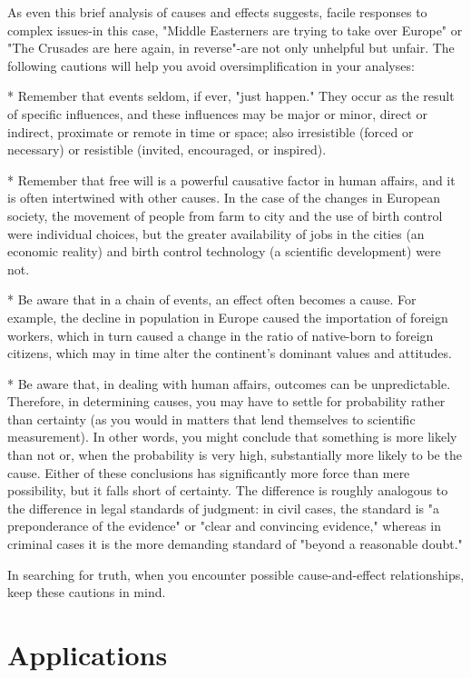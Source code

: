 \documentclass{book}
\begin{document}
As even this brief analysis of causes and effects suggests, facile responses to complex issues-in this case, "Middle Easterners are trying to take over Europe" or "The Crusades are here again, in reverse"-are not only unhelpful but unfair. The following cautions will help you avoid oversimplification in your analyses:

* Remember that events seldom, if ever, "just happen." They occur as the result of specific influences, and these influences may be major or minor, direct or indirect, proximate or remote in time or space; also irresistible (forced or necessary) or resistible (invited, encouraged, or inspired).

* Remember that free will is a powerful causative factor in human affairs, and it is often intertwined with other causes. In the case of the changes in European society, the movement of people from farm to city and the use of birth control were individual choices, but the greater availability of jobs in the cities (an economic reality) and birth control technology (a scientific development) were not. 

* Be aware that in a chain of events, an effect often becomes a cause. For example, the decline in population in Europe caused the importation of foreign workers, which in turn caused a change in the ratio of native-born to foreign citizens, which may in time alter the continent’s dominant values and attitudes.

* Be aware that, in dealing with human affairs, outcomes can be unpredictable. Therefore, in determining causes, you may have to settle for probability rather than certainty (as you would in matters that lend themselves to scientific measurement). In other words, you might conclude that something is more likely than not or, when the probability is very high, substantially more likely to be the cause. Either of these conclusions has significantly more force than mere possibility, but it falls short of certainty. The difference is roughly analogous to the difference in legal standards of judgment: in civil cases, the standard is "a preponderance of the evidence" or "clear and convincing evidence," whereas in criminal cases it is the more demanding standard of "beyond a reasonable doubt."

In searching for truth, when you encounter possible cause-and-effect relationships, keep these cautions in mind.

\section{Applications}
\end{document}
